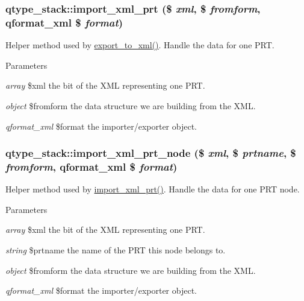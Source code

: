 \hypertarget{classqtype__stack_a9de32a45ce824d8c0e4dffa056846876}{
\subsubsection[{import\_\-xml\_\-prt}]{\setlength{\rightskip}{0pt plus 5cm}qtype\_\-stack::import\_\-xml\_\-prt (\$ {\em xml}, \/  \$ {\em fromform}, \/  qformat\_\-xml \$ {\em format})}}
\label{classqtype__stack_a9de32a45ce824d8c0e4dffa056846876}
Helper method used by \hyperlink{classqtype__stack_abb4e2b1212e53ee6c4a36f2315d3e085}{export\_\-to\_\-xml()}. Handle the data for one PRT. 
\begin{DoxyParams}{Parameters}
\item[{\em array}]\$xml the bit of the XML representing one PRT. \item[{\em object}]\$fromform the data structure we are building from the XML. \item[{\em qformat\_\-xml}]\$format the importer/exporter object. \end{DoxyParams}
\hypertarget{classqtype__stack_a555399cd47d276ee107e157ae6db66b2}{
\subsubsection[{import\_\-xml\_\-prt\_\-node}]{\setlength{\rightskip}{0pt plus 5cm}qtype\_\-stack::import\_\-xml\_\-prt\_\-node (\$ {\em xml}, \/  \$ {\em prtname}, \/  \$ {\em fromform}, \/  qformat\_\-xml \$ {\em format})}}
\label{classqtype__stack_a555399cd47d276ee107e157ae6db66b2}
Helper method used by \hyperlink{classqtype__stack_a9de32a45ce824d8c0e4dffa056846876}{import\_\-xml\_\-prt()}. Handle the data for one PRT node. 
\begin{DoxyParams}{Parameters}
\item[{\em array}]\$xml the bit of the XML representing one PRT. \item[{\em string}]\$prtname the name of the PRT this node belongs to. \item[{\em object}]\$fromform the data structure we are building from the XML. \item[{\em qformat\_\-xml}]\$format the importer/exporter object. \end{DoxyParams}

